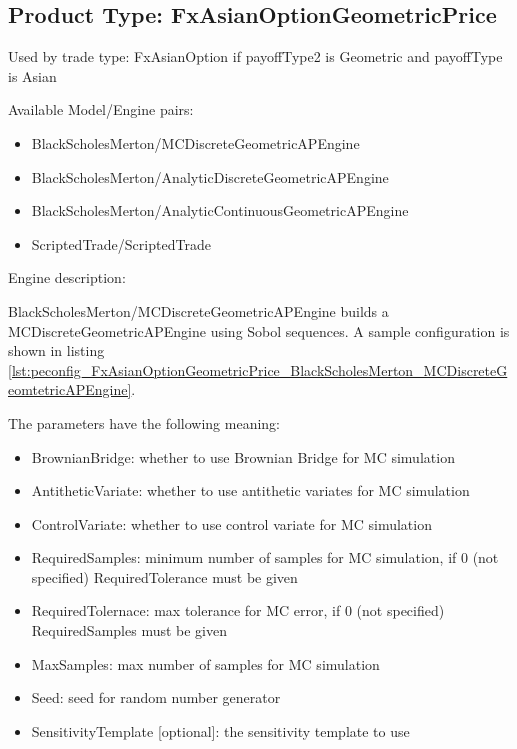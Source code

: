 \subsection{Product Type: FxAsianOptionGeometricPrice}

Used by trade type: FxAsianOption if payoffType2 is Geometric and payoffType is Asian

Available Model/Engine pairs:

\begin{itemize}
  \item BlackScholesMerton/MCDiscreteGeometricAPEngine
  \item BlackScholesMerton/AnalyticDiscreteGeometricAPEngine
  \item BlackScholesMerton/AnalyticContinuousGeometricAPEngine
  \item ScriptedTrade/ScriptedTrade
\end{itemize}

Engine description:

BlackScholesMerton/MCDiscreteGeometricAPEngine builds a MCDiscreteGeometricAPEngine using Sobol sequences. A sample
configuration is shown in listing
\ref{lst:peconfig_FxAsianOptionGeometricPrice_BlackScholesMerton_MCDiscreteGeomtetricAPEngine}.

The parameters have the following meaning:

\begin{itemize}
\item BrownianBridge: whether to use Brownian Bridge for MC simulation
\item AntitheticVariate: whether to use antithetic variates for MC simulation
\item ControlVariate: whether to use control variate for MC simulation
\item RequiredSamples: minimum number of samples for MC simulation, if 0 (not specified) RequiredTolerance must be given
\item RequiredTolernace: max tolerance for MC error, if 0 (not specified) RequiredSamples must be given
\item MaxSamples: max number of samples for MC simulation
\item Seed: seed for random number generator
\item SensitivityTemplate [optional]: the sensitivity template to use 
\end{itemize}

